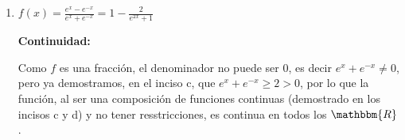 \documentclass[12pt]{article}
\begin{document}
\begin{enumerate}[\hspace{9px} a)]
        \textbf{Derivadas: }
            \begin{equation*}
                f'(x) = \frac{d}{dx}\left(e^x-e^{-x}\right) = e^x(1)-e^{-x}(-1) = e^x+e^{-x}
            \end{equation*}

            \begin{equation*}
                f''(x) = \frac{d}{dx}\left(e^x+e^{-x}\right) = e^x(1)+e^{-x}(-1) = e^x-e^{-x}
            \end{equation*}

        \textbf{Puntos y valores cr\'iticos: }\medskip

            \(f'(x)=0 \Rightarrow e^x+e^{-x}=0\)\quad Definimos \(e^x+e^{-x}\) en el ejercicio c y demostramos que \(e^x+e^{-x}\geq2 \ \forall x\in\mathbbm{R}\). Por lo que \(f'(x)\) nunca es 0, as\'i entonces, la funci\'on no tiene puntos cr\'iticos.\medskip

        \textbf{Crecencia: }\medskip

            Analogo al anterior, como en el ejericico c demostramos que \(e^x+e^{-x}\geq2 \ \forall x\in\mathbbm{R}\), as\'i \(f'(x)>0\), por lo que la funci\'on siempre es creciente.\medskip

        \textbf{Puntos y valores de Inflexi\'on: }\medskip

            Como \(f''(x)=e^x-e^{-x}=f(x)\) y ya demostramos que \(f(x)=0\) cuando \(x=0 \Rightarrow (0,0)\), \((0,0)\) es un valor de inflexi\'on.

        \textbf{Concavidad y Convexidad: }\medskip

            Como \(f''(x)=e^x-e^{-x}=f(x)\) y ya demostramos que cuando \(x>0 \Rightarrow f(x)>0\), la funci\'on es convexa en \((0,\infty)\), y, como es impar, es c\'oncava en \(x<0\).\medskip

        \textbf{Gr\'afica: }

    \item \(f(x)=\displaystyle\frac{e^x-e^{-x}}{e^x+e^{-x}}=1-\frac{2}{e^{2x}+1}\)\medskip
    
        \textbf{Continuidad: }\medskip

            Como \(f\) es una fracci\'on, el denominador no puede ser 0, es decir \(e^x+e^{-x}\neq0\), pero ya demostramos, en el inciso c, que \(e^x+e^{-x}\geq2>0\), por lo que la funci\'on, al ser una composici\'on de funciones continuas (demostrado en los incisos c y d) y no tener resstricciones, es continua en todos los \(\mathbbm{R}\).\medskip


\end{enumerate}
\end{document}
